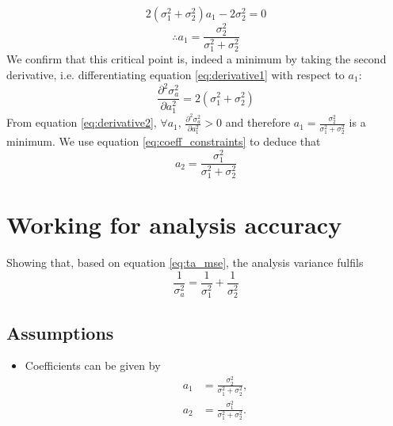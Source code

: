 \begin{equation*}
    2 \left( \sigma_1^2 + \sigma_2^2 \right) a_1 - 2 \sigma_2^2 = 0
\end{equation*}
\begin{equation}
\therefore a_1 = \frac{\sigma_2^2}{\sigma_1^2 + \sigma_2^2} \label{eq:result_a1}
\end{equation}
We confirm that this critical point is, indeed a minimum by taking the second derivative, i.e. differentiating equation \ref{eq:derivative1} with respect to $a_1$:
\begin{equation}
    \frac{\partial^2 \sigma_a^2}{\partial a_1^2} = 2 \left( \sigma_1^2 + \sigma_2^2 \right) \label{eq:derivative2}
\end{equation}
From equation \ref{eq:derivative2}, $\forall a_1$, $\frac{\partial ^2 \sigma_a^2}{\partial a_1^2} > 0$ and therefore $a_1 = \frac{\sigma_2^2}{\sigma_1^2 + \sigma_2^2}$ is a minimum.
We use equation \ref{eq:coeff_constraints} to deduce that
\begin{equation}
    a_2 = \frac{\sigma_1^2}{\sigma_1^2 + \sigma_2^2} \label{eq:result_a2}
\end{equation}

\section{Working for analysis accuracy}
\label{sec:kalnay:analysis}
Showing that, based on equation \ref{eq:ta_mse}, the analysis variance fulfils
\begin{equation}
    \frac{1}{\sigma_a^2} = \frac{1}{\sigma_1^2} + \frac{1}{\sigma_2^2}
\end{equation}

\subsection{Assumptions}
\label{sub:analysis:assumptions}

\begin{itemize}
    \item Coefficients can be given by
    \begin{subequations}
        \begin{align}
            a_1 &= \frac{\sigma_2^2}{\sigma_1^2 + \sigma_2^2}, \\
            a_2 &= \frac{\sigma_1^2}{\sigma_1^2 + \sigma_2^2}.
        \end{align}
        \label{eq:coefficients_results}
    \end{subequations}
\end{itemize}

